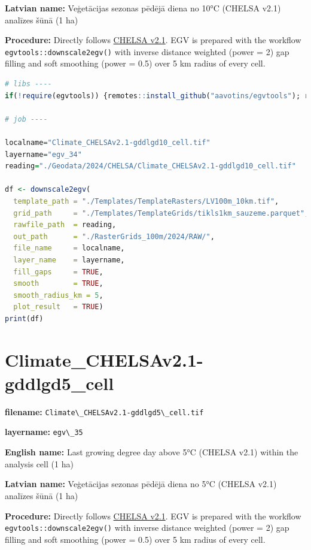 \documentclass[
]{book}
\newcommand{\passthrough}[1]{#1}
\begin{document}
\textbf{Latvian name:} Veģetācijas sezonas pēdējā diena no 10°C (CHELSA v2.1) analīzes šūnā (1 ha)

\textbf{Procedure:} Directly follows \hyperref[Ch04.11]{CHELSA v2.1}. EGV is prepared with the
workflow \passthrough{\lstinline!egvtools::downscale2egv()!} with inverse distance weighted (power = 2)
gap filling and soft smoothing (power = 0.5) over 5 km radius of every cell.

\begin{lstlisting}[language=R]
# libs ----
if(!require(egvtools)) {remotes::install_github("aavotins/egvtools"); require(egvtools)}

# job ----

localname="Climate_CHELSAv2.1-gddlgd10_cell.tif"
layername="egv_34"
reading="./Geodata/2024/CHELSA/Climate_CHELSAv2.1-gddlgd10_cell.tif"

df <- downscale2egv(
  template_path = "./Templates/TemplateRasters/LV100m_10km.tif",
  grid_path     = "./Templates/TemplateGrids/tikls1km_sauzeme.parquet",
  rawfile_path  = reading,
  out_path      = "./RasterGrids_100m/2024/RAW/",
  file_name     = localname,
  layer_name    = layername,
  fill_gaps     = TRUE,
  smooth        = TRUE,
  smooth_radius_km = 5,
  plot_result   = TRUE)
print(df)
\end{lstlisting}

\section{Climate\_CHELSAv2.1-gddlgd5\_cell}\label{ch06.035}

\textbf{filename:} \passthrough{\lstinline!Climate\_CHELSAv2.1-gddlgd5\_cell.tif!}

\textbf{layername:} \passthrough{\lstinline!egv\_35!}

\textbf{English name:} Last growing degree day above 5°C (CHELSA v2.1) within the analysis cell (1 ha)

\textbf{Latvian name:} Veģetācijas sezonas pēdējā diena no 5°C (CHELSA v2.1) analīzes šūnā (1 ha)

\textbf{Procedure:} Directly follows \hyperref[Ch04.11]{CHELSA v2.1}. EGV is prepared with the
workflow \passthrough{\lstinline!egvtools::downscale2egv()!} with inverse distance weighted (power = 2)
gap filling and soft smoothing (power = 0.5) over 5 km radius of every cell.
\end{document}
